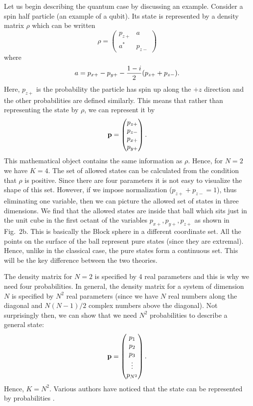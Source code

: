 \documentclass[12pt]{article}
\begin{document}
Let us begin describing the quantum case by discussing an example.
Consider a spin half particle (an example of a qubit).  Its state is
represented by a density matrix $\rho$ which can be written
\begin{equation}
\rho= \left( \begin{matrix} p_{z+} & a \\ a^* & p_{z-} \end{matrix}
\right)
\end{equation}
where
\begin{equation}
a=p_{x+} - p_{y+} - {1-i\over 2}(p_{z+}+p_{z-}).
\end{equation}
Here, $p_{z+}$ is the probability the particle has
spin up along the $+z$ direction and the other probabilities are defined
similarly.  This means that rather than
representing the state by $\rho$, we can represent it by
\begin{equation}
{\bf p} = \left( \begin{matrix} p_{z+} \\ p_{z-} \\ p_{x+} \\ p_{y+}
\end{matrix} \right).
\end{equation}
This mathematical object contains the same information as $\rho$.
Hence, for $N=2$ we have $K=4$.  The set of allowed states can be
calculated from the condition that $\rho$ is positive.  Since there are
four parameters it is not easy to visualize the shape of this set.
However, if we impose normalization ($p_{z+}+p_{z-}=1$), thus eliminating
one variable, then we can picture the allowed set of states in three
dimensions.  We find that the allowed states are inside that ball which sits
just in the unit cube in the first octant of the variables
$p_{x+}, p_{y+}, p_{z+}$ as shown in Fig.~2b.  This is basically the
Block sphere in a different coordinate set.  All the points on the
surface of the ball represent pure states (since they are extremal).
Hence, unlike in the classical case, the pure states form a continuous
set.  This will be the key difference between the two theories.

The density matrix for $N=2$ is specified by 4 real parameters and this
is why we need four probabilities.  In general, the density matrix for a
system of dimension $N$ is specified by $N^2$ real parameters (since we have
$N$ real numbers along the diagonal and $N(N-1)/2$ complex numbers above
the diagonal).  Not surprisingly then, we can show that we
need $N^2$ probabilities to describe a general state:
\begin{equation}
  {\bf p} = \left(
  \begin{matrix} p_1 \\ p_2 \\ p_3 \\ \vdots \\ p_{N^2} \end{matrix}
  \right).
\end{equation}
Hence, $K=N^2$.  Various authors have noticed that the state can be
represented by probabilities \cite{wootters,prug,busch,stefan}.
\end{document}
